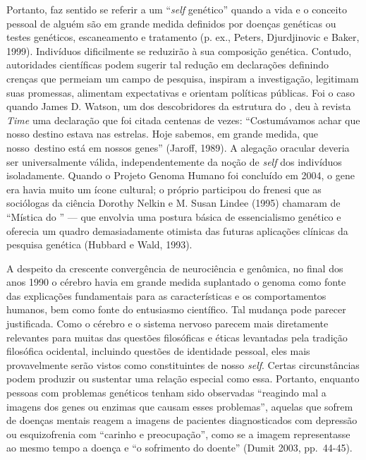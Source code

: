 Portanto, faz sentido se referir a um ``\emph{self} genético'' quando a vida e
o conceito pessoal de alguém são em grande medida definidos por doenças
genéticas ou testes genéticos, escaneamento e tratamento (p. ex., Peters,
Djurdjinovic e Baker, 1999). Indivíduos dificilmente se reduzirão à sua composição genética. Contudo, autoridades científicas
podem sugerir tal redução em declarações definindo crenças que permeiam
um campo de pesquisa, inspiram a investigação, legitimam suas promessas,
alimentam expectativas e orientam políticas públicas. Foi o caso quando
James D. Watson, um dos descobridores da estrutura do , deu à revista
\emph{Time} uma declaração que foi citada centenas de vezes:
``Costumávamos achar que nosso destino estava nas estrelas. Hoje
sabemos, em grande medida, que nosso~destino está em nossos genes''
(Jaroff, 1989). A alegação oracular deveria ser universalmente válida,
independentemente da noção de \emph{self} dos indivíduos isoladamente. Quando o
Projeto Genoma Humano foi concluído em 2004, o gene era havia muito um
ícone cultural; o próprio  participou do frenesi que as sociólogas da
ciência Dorothy Nelkin e M. Susan Lindee (1995) chamaram de ``Mística do
'' --- que envolvia uma postura básica de essencialismo genético e
oferecia um quadro demasiadamente otimista das futuras aplicações
clínicas da pesquisa genética (Hubbard e Wald, 1993).

A despeito da crescente convergência de neurociência e genômica, no
final dos anos 1990 o cérebro havia em grande medida suplantado o genoma
como fonte das explicações fundamentais para as características e os
comportamentos humanos, bem como fonte do entusiasmo científico. Tal
mudança pode parecer justificada. Como o cérebro e o sistema nervoso
parecem mais diretamente relevantes para muitas das questões filosóficas
e éticas levantadas pela tradição filosófica ocidental, incluindo
questões de identidade pessoal, eles mais provavelmente serão vistos
como constituintes de nosso \emph{self}. Certas circunstâncias podem produzir
ou sustentar uma relação especial como essa. Portanto, enquanto pessoas
com problemas genéticos tenham sido observadas ``reagindo mal a imagens
dos genes ou enzimas que causam esses problemas'', aquelas que sofrem de
doenças mentais reagem a imagens de pacientes diagnosticados com
depressão ou esquizofrenia com ``carinho e preocupação'', como se a
imagem representasse ao mesmo tempo a doença e ``o sofrimento do
doente'' (Dumit 2003, pp.~44-45).

